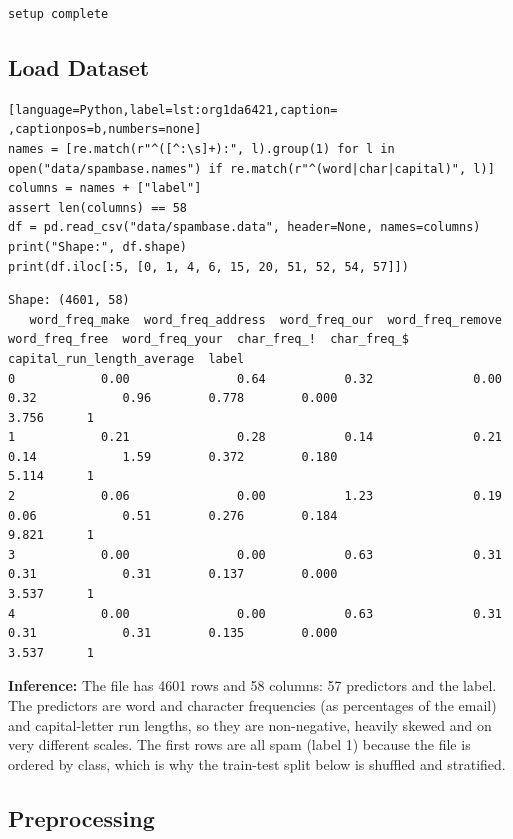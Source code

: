 \documentclass[11pt]{article}
\begin{document}
\begin{verbatim}
setup complete
\end{verbatim}

\subsection*{Load Dataset}
\label{sec:org03ae4d9}

\begin{lstlisting}[language=Python,label=lst:org1da6421,caption= ,captionpos=b,numbers=none]
names = [re.match(r"^([^:\s]+):", l).group(1) for l in open("data/spambase.names") if re.match(r"^(word|char|capital)", l)]
columns = names + ["label"]
assert len(columns) == 58
df = pd.read_csv("data/spambase.data", header=None, names=columns)
print("Shape:", df.shape)
print(df.iloc[:5, [0, 1, 4, 6, 15, 20, 51, 52, 54, 57]])
\end{lstlisting}

\begin{verbatim}
Shape: (4601, 58)
   word_freq_make  word_freq_address  word_freq_our  word_freq_remove  word_freq_free  word_freq_your  char_freq_!  char_freq_$  capital_run_length_average  label
0            0.00               0.64           0.32              0.00            0.32            0.96        0.778        0.000                       3.756      1
1            0.21               0.28           0.14              0.21            0.14            1.59        0.372        0.180                       5.114      1
2            0.06               0.00           1.23              0.19            0.06            0.51        0.276        0.184                       9.821      1
3            0.00               0.00           0.63              0.31            0.31            0.31        0.137        0.000                       3.537      1
4            0.00               0.00           0.63              0.31            0.31            0.31        0.135        0.000                       3.537      1
\end{verbatim}


\textbf{Inference:} The file has 4601 rows and 58 columns: 57 predictors and the label. The predictors are word
and character frequencies (as percentages of the email) and capital-letter run lengths, so
they are non-negative, heavily skewed and on very different scales. The first rows are all
spam (label 1) because the file is ordered by class, which is why the train-test split below
is shuffled and stratified.

\subsection*{Preprocessing}
\label{sec:org25a6386}
\end{document}

